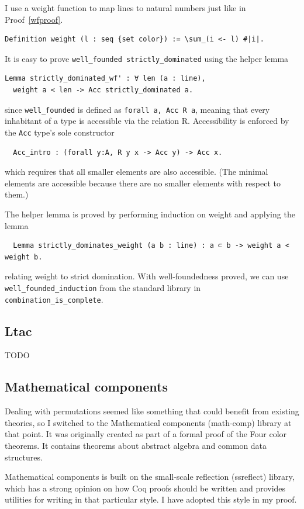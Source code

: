 \documentclass[english, 12pt, a4paper, sci, a-1b, online]{aaltothesis}
\newcommand\icoq[1]{\texttt{#1}}
\begin{document}
I use a weight function to map lines to natural numbers just like in Proof~\ref{wfproof}.
\begin{verbatim}
Definition weight (l : seq {set color}) := \sum_(i <- l) #|i|.
\end{verbatim}
It is easy to prove \icoq{well_founded strictly_dominated} using the helper lemma
\begin{verbatim}
Lemma strictly_dominated_wf' : ∀ len (a : line),
  weight a < len -> Acc strictly_dominated a.
\end{verbatim}
since \icoq{well_founded} is defined as \icoq{forall a, Acc R a}, meaning that every inhabitant of a type is accessible via the relation R. Accessibility is enforced by the \icoq{Acc} type's sole constructor
\begin{verbatim}
  Acc_intro : (forall y:A, R y x -> Acc y) -> Acc x.
\end{verbatim}
which requires that all smaller elements are also accessible. (The minimal elements are accessible because there are no smaller elements with respect to them.)

The helper lemma is proved by performing induction on weight and applying the lemma
\begin{verbatim}
  Lemma strictly_dominates_weight (a b : line) : a ⊂ b -> weight a < weight b.
\end{verbatim}
relating weight to strict domination. With well-foundedness proved, we can use \icoq{well_founded_induction} from the standard library in \icoq{combination_is_complete}.

\subsection{Ltac}

TODO

\subsection{Mathematical components}

Dealing with permutations seemed like something that could benefit from existing theories, so I switched to the Mathematical components (math-comp) library at that point. It was originally created as part of a formal proof of the Four color theorems. It contains theorems about abstract algebra and common data structures.

Mathematical components is built on the small-scale reflection (ssreflect) library, which has a strong opinion on how Coq proofs should be written and provides utilities for writing in that particular style. I have adopted this style in my proof.
\end{document}
